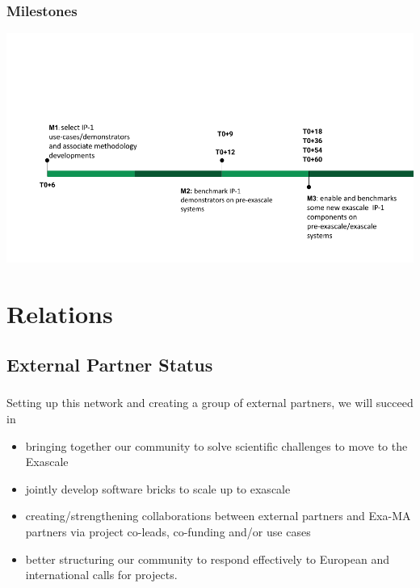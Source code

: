 \begin{frame}
  \frametitle{Milestones}
\vspace{-0.5cm}
  \begin{center}
    \includegraphics[width=\linewidth]{../../figures/exama-timeline.png}
  \end{center}




\end{frame}




\section{Relations}

\subsection*{External Partner Status}
\begin{frame}
  \frametitle{\insertsectionhead}
  \framesubtitle{\insertsubsectionhead}

  Setting up this network and creating a group of external partners, we will succeed in
  \begin{itemize}
    \item bringing together our community to solve scientific challenges to move to the Exascale
    \item jointly develop software bricks to scale up to exascale
    \item creating/strengthening collaborations between external partners and Exa-MA partners via project co-leads, co-funding and/or use cases
    \item better structuring our community to respond effectively to European and international calls for projects.
  \end{itemize}

\end{frame}
